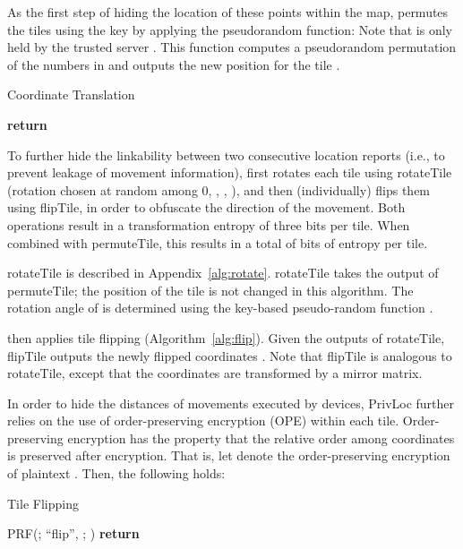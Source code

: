 \documentclass{llncs}
\newcommand\sol{{\sf PrivLoc}}
\begin{document}
As the first step of hiding the location of these points within the map,  permutes the tiles using the key  by applying the pseudorandom function:  Note that  is
only held by the trusted server . This function computes a pseudorandom permutation of the numbers in  and outputs the new position  for the tile .


\begin{algorithm}[t]
\caption{Coordinate Translation}
\label{alg:divide}	
\begin{algorithmic}[1]
\State 
\State 
\State 
\State 
\State \textbf{return}
\EndProcedure
\end{algorithmic}
\end{algorithm}

To further hide the linkability between two consecutive location reports (i.e., to prevent leakage of movement information),  first rotates each tile using {\sf rotateTile} (rotation
chosen at random among 0, , , ), and then (individually) flips them using {\sf flipTile}, in order to obfuscate the
direction of the movement. Both operations result in a transformation entropy of three bits per tile. When combined with {\sf permuteTile}, this results in a total of  bits of entropy per tile.

{\sf rotateTile} is described in Appendix~\ref{alg:rotate}. {\sf rotateTile} takes the output of {\sf permuteTile}; the position of the tile  is not changed in this algorithm. The
rotation angle of  is determined using the key-based pseudo-random function .


 then applies tile flipping (Algorithm~\ref{alg:flip}). Given the outputs of {\sf rotateTile}, {\sf flipTile} outputs the newly flipped coordinates .
Note that {\sf flipTile} is analogous to {\sf rotateTile}, except that the coordinates are transformed by a mirror matrix.


In order to hide the distances of movements executed by devices, \sol{} further relies on the use of order-preserving encryption (OPE) within each tile.
Order-preserving encryption has the property that the relative order among coordinates is preserved after encryption. That is, let  denote the order-preserving encryption of plaintext .
Then, the following holds:
\vspace{-1 em}


\begin{algorithm}[tbp]
\caption{Tile Flipping}
\label{alg:flip}
\begin{algorithmic}[1]
\State  PRF(; ``flip'', ; )
\If 
	\State 
\EndIf
\State \textbf{return}
\EndProcedure
\end{algorithmic}
\end{algorithm}
\end{document}
